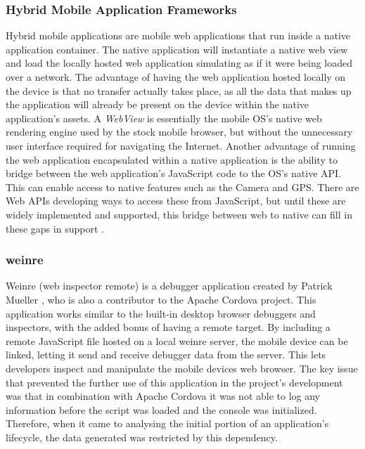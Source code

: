 \documentclass[final]{cmpreport}
\begin{document}
\subsubsection{Hybrid Mobile Application Frameworks}
Hybrid mobile applications are mobile web applications that run inside a native application container. The native application will instantiate a native web view and load the locally hosted web application simulating as if it were being loaded over a network. The advantage of having the web application hosted locally on the device is that no transfer actually takes place, as all the data that makes up the application will already be present on the device within the native application's assets. A \textit{WebView} is essentially the mobile OS's native web rendering engine used by the stock mobile browser, but without the unnecessary user interface required for navigating the Internet. Another advantage of running the web application encapsulated within a native application is the ability to bridge between the web application's JavaScript code to the OS's native API. This can enable access to native features such as the Camera and GPS. There are Web APIs developing ways to access these from JavaScript, but until these are widely implemented and supported, this bridge between web to native can fill in these gaps in support \citep{Smith}.

\subsubsection{weinre}
\label{sec:weinre}
Weinre \footnotemark (web inspector remote) is a debugger application created by Patrick Mueller \footnotemark, who is also a contributor to the Apache Cordova project. This application works similar to the built-in desktop browser debuggers and inspectors, with the added bonus of having a remote target. By including a remote JavaScript file hosted on a local weinre server, the mobile device can be linked, letting it send and receive debugger data from the server. This lets developers inspect and manipulate the mobile devices web browser. The key issue that prevented the further use of this application in the project's development was that in combination with Apache Cordova it was not able to log any information before the script was loaded and the console was initialized. Therefore, when it came to analysing the initial portion of an application's lifecycle, the data generated was restricted by this dependency.

\end{document}
